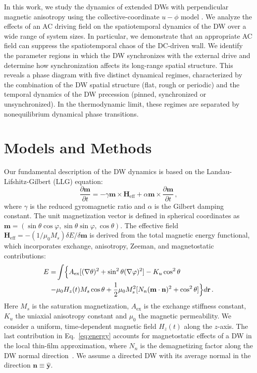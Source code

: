 \documentclass[prb,aps,twocolumn,superscriptaddress,floatfix]{revtex4-1}
\begin{document}
In this work, we study the dynamics of extended DWs with perpendicular magnetic anisotropy using the collective-coordinate $u-\phi$ model \cite{Slonczewski1972, Schryer1974}. We analyze the effects of an AC driving field on the spatiotemporal dynamics of the DW over a wide range of system sizes. In particular, we demonstrate that an appropriate AC field can suppress the spatiotemporal chaos of the DC-driven wall. We identify the parameter regions in which the DW synchronizes with the external drive and determine how synchronization affects its long-range spatial structure. This reveals a phase diagram with five distinct dynamical regimes, characterized by the combination of the DW spatial structure (flat, rough or periodic) and the temporal dynamics of the DW precession (pinned, synchronized or unsynchronized). In the thermodynamic limit, these regimes are separated by nonequilibrium dynamical phase transitions.

\section{Models and Methods}
Our fundamental description of the DW dynamics is based on the Landau-Lifshitz-Gilbert (LLG) equation:
%
\begin{equation}
\dfrac{\partial\mathbf{m}}{\partial t}= -\gamma\mathbf{m}\times\mathbf{H}_{\text{eff}}+\alpha\mathbf{m}\times\dfrac{\partial\mathbf{m}}{\partial t} \, ,
\label{eq_LLG}
\end{equation}
%
where $\gamma$ is the reduced gyromagnetic ratio and $\alpha$ is the Gilbert damping constant. The unit magnetization vector is defined in spherical coordinates as $\mathbf{m} = (\sin\theta \cos\varphi, \sin\theta \sin\varphi, \cos\theta)$. The effective field $\mathbf{H}_{\text{eff}}=-(1/\mu_0M_s) \delta E/\delta \mathbf{m}$ is derived from the total magnetic energy functional, which incorporates exchange, anisotropy, Zeeman, and magnetostatic contributions:
%
\begin{equation}
\begin{split}
    \label{eq:energy}
    E =& \int \Bigl\{  A_\text{ex}[(\nabla\theta)^2+\sin^{2}\theta(\nabla\varphi)^2]-K_u\cos^2\theta  \\
    -&\mu_0H_z(t)M_s\cos\theta +\dfrac{1}{2}\mu_0M_s^{2} [N_{n}(\mathbf{m} \cdot \mathbf{n})^{2}+\cos^{2}\theta] \Bigl\}d\mathbf{r} \, .
\end{split}
\end{equation}
%
Here $M_s$ is the saturation magnetization, $A_\text{ex}$ is the exchange stiffness constant, $K_u$ the uniaxial anisotropy constant and $\mu_0$ the magnetic permeability. We consider a uniform, time-dependent magnetic field $H_z(t)$ along the $z$-axis. The last contribution in Eq.~\eqref{eq:energy} accounts for magnetostatic effects of a DW in the local thin-film approximation, where $N_n$ is the demagnetizing factor along the DW normal direction~\cite{skaugen2019}. We assume a directed DW with its average normal in the direction ${\mathbf n}\equiv \hat{ \mathbf{y}}$.
 
\end{document}
